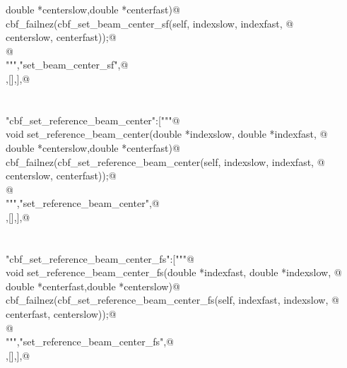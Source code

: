 \documentclass[10pt,a4paper,twoside,notitlepage]{article}
\begin{document}
\begin{flushleft}
\begin{minipage}{\linewidth}
\begin{list}{}{}
\mbox{}\verb@                         double *centerslow,double *centerfast){@\\
\mbox{}\verb@        cbf_failnez(cbf_set_beam_center_sf(self, indexslow, indexfast, @\\
\mbox{}\verb@                                       centerslow, centerfast));@\\
\mbox{}\verb@        }@\\
\mbox{}\verb@""","set_beam_center_sf",@\\
\mbox{},[],],@\\
\mbox{}\verb@@\\
\mbox{}\verb@@\\
\mbox{}\verb@"cbf_set_reference_beam_center":["""@\\
\mbox{}\verb@    void set_reference_beam_center(double *indexslow, double *indexfast, @\\
\mbox{}\verb@                         double *centerslow,double *centerfast){@\\
\mbox{}\verb@        cbf_failnez(cbf_set_reference_beam_center(self, indexslow, indexfast, @\\
\mbox{}\verb@                                       centerslow, centerfast));@\\
\mbox{}\verb@        }@\\
\mbox{}\verb@""","set_reference_beam_center",@\\
\mbox{},[],],@\\
\mbox{}\verb@@\\
\mbox{}\verb@@\\
\mbox{}\verb@"cbf_set_reference_beam_center_fs":["""@\\
\mbox{}\verb@    void set_reference_beam_center_fs(double *indexfast, double *indexslow, @\\
\mbox{}\verb@                         double *centerfast,double *centerslow){@\\
\mbox{}\verb@        cbf_failnez(cbf_set_reference_beam_center_fs(self, indexfast, indexslow, @\\
\mbox{}\verb@                                       centerfast, centerslow));@\\
\mbox{}\verb@        }@\\
\mbox{}\verb@""","set_reference_beam_center_fs",@\\
\mbox{},[],],@\\

\end{list}
\end{minipage}
\end{flushleft}
\end{document}
